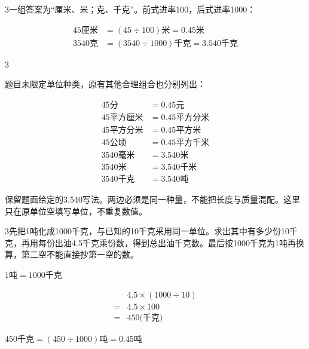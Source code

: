 \documentclass[multi=snippet,border={5bp 20bp 5bp 5bp}]{standalone}
\newenvironment{snippet}[3]{\begin{minipage}{#1bp}\color{answerred}\fontsize{#2}{#3}\selectfont\raggedright}{\end{minipage}}
\begin{document}
\begin{snippet}{505}{11.5}{14}\begin{multicols}{3}\raggedcolumns 一组答案为“厘米、米；克、千克”。前式进率100，后式进率1000：\par\noindent\end{multicols}\[\displaystyle \begin{aligned}45\text{厘米}&=(45\div100)\text{米}=0.45\text{米}\\3540\text{克}&=(3540\div1000)\text{千克}=3.540\text{千克}\end{aligned}\]\begin{multicols}{3}\raggedcolumns \par 题目未限定单位种类，原有其他合理组合也分别列出：\par\noindent\[\displaystyle \begin{aligned}45\text{分}&=0.45\text{元}\\45\text{平方厘米}&=0.45\text{平方分米}\\45\text{平方分米}&=0.45\text{平方米}\\45\text{公顷}&=0.45\text{平方千米}\\3540\text{毫米}&=3.540\text{米}\\3540\text{米}&=3.540\text{千米}\\3540\text{千克}&=3.540\text{吨}\end{aligned}\]\par 保留题面给定的3.540写法。两边必须是同一种量，不能把长度与质量混配。这里只在原单位空填写单位，不重复数值。\end{multicols}\end{snippet}
\begin{snippet}{505}{11.5}{14}\begin{multicols}{3}\raggedcolumns 先把1吨化成1000千克，与已知的10千克采用同一单位。求出其中有多少份10千克，再用每份出油4.5千克乘份数，得到总出油千克数。最后按1000千克为1吨再换算，第二空不能直接抄第一空的数。\par \noindent\(\displaystyle 1\text{吨}=1000\text{千克}\)\allowbreak \par \noindent\[\displaystyle \begin{aligned}&4.5\times(1000\div10)\\={}&4.5\times100\\={}&450\text{(千克)}\end{aligned}\]\par \noindent\(\displaystyle 450\text{千克}=(450\div1000)\text{吨}=0.45\text{吨}\)\allowbreak \par\end{multicols}\end{snippet}
\end{document}
